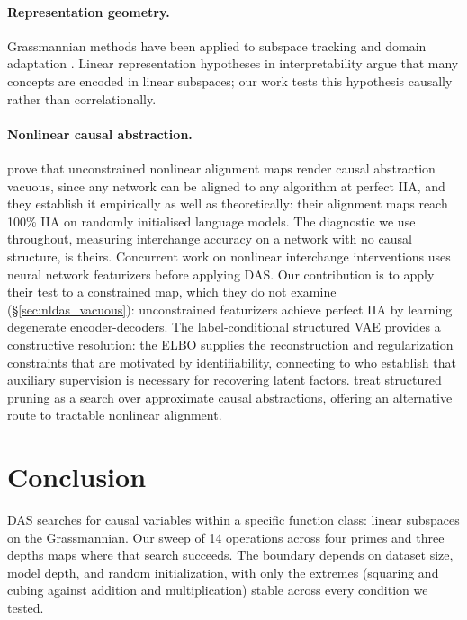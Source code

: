 \documentclass{article}
\begin{document}
\paragraph{Representation geometry.}
Grassmannian methods have been applied to subspace tracking and domain adaptation
\citep{edelman1998geometry, gopalan2011domain}. Linear representation hypotheses
in interpretability \citep{marks2023geometry, engels2024language,
park2024linear} argue that many concepts are encoded in linear subspaces; our
work tests this hypothesis causally rather than correlationally.

\paragraph{Nonlinear causal abstraction.}
\citet{sutter2025nonlinear} prove that unconstrained nonlinear alignment maps
render causal abstraction vacuous, since any network can be aligned to any
algorithm at perfect IIA, and they establish it empirically as well as
theoretically: their alignment maps reach 100\% IIA on randomly initialised
language models. The diagnostic we use throughout, measuring interchange accuracy
on a network with no causal structure, is theirs. Concurrent work on nonlinear
interchange interventions \citep{geiger2024causal} uses neural network
featurizers before applying DAS. Our contribution is to apply their test to a
constrained map, which they do not examine
(\S\ref{sec:nldas_vacuous}): unconstrained featurizers achieve perfect IIA
by learning degenerate encoder-decoders. The label-conditional structured VAE provides a
constructive resolution: the ELBO supplies the reconstruction and
regularization constraints that are motivated by identifiability, connecting to
\citet{khemakhem2020variational, sutter2020multimodal} who establish that
auxiliary supervision is necessary for recovering latent factors.
\citet{asiaee2026causal} treat structured pruning as a search over approximate
causal abstractions, offering an alternative route to tractable nonlinear
alignment.


\section{Conclusion}
\label{sec:conclusion}

DAS searches for causal variables within a specific function class: linear
subspaces on the Grassmannian. Our sweep of 14 operations across four primes and
three depths maps where that search succeeds. The boundary depends on dataset
size, model depth, and random initialization, with only the extremes
(squaring and cubing against addition and multiplication) stable across every
condition we tested.
\end{document}
